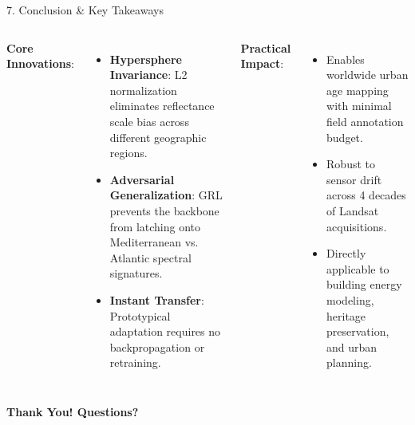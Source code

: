 \documentclass[aspectratio=169,10pt]{beamer}
\begin{document}
\begin{frame}{7. Conclusion \& Key Takeaways}
  \begin{columns}[T]
    \textbf{Core Innovations}:
    \begin{itemize}
      \item \textbf{Hypersphere Invariance}: L2 normalization eliminates reflectance scale bias across different geographic regions.
      \item \textbf{Adversarial Generalization}: GRL prevents the backbone from latching onto Mediterranean vs. Atlantic spectral signatures.
      \item \textbf{Instant Transfer}: Prototypical adaptation requires no backpropagation or retraining.
    \end{itemize}

    \textbf{Practical Impact}:
    \begin{itemize}
      \item Enables worldwide urban age mapping with minimal field annotation budget.
      \item Robust to sensor drift across 4 decades of Landsat acquisitions.
      \item Directly applicable to building energy modeling, heritage preservation, and urban planning.
    \end{itemize}
  \end{columns}

  \vspace{0.6cm}
  \centering
  \Large \textbf{Thank You! Questions?}
\end{frame}
\end{document}
